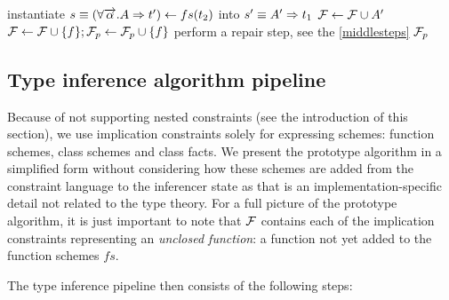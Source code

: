 \begin{algorithm}
\begin{algorithmic}
                    \State instantiate $s \equiv (\forall \overrightarrow{\alpha} . A \Rightarrow t') \gets fs(t_2)$ into $s' \equiv A' \Rightarrow t_1$
                    \State $\mathcal F \gets \mathcal F \cup A'$
                \Else
                    \State $ \mathcal F \gets \mathcal F \cup \{f\}; \mathcal F_p \gets \mathcal F_p \cup \{f\}$ 
                \EndIf
            \EndIf
            \State perform a repair step, see the \cref{middlesteps}
        \EndWhile
        \State \Return $\mathcal F_p$
    \end{algorithmic}
\end{algorithm}

\subsection{Type inference algorithm pipeline}

Because of not supporting nested constraints (see the introduction of this section), we use implication constraints solely for expressing schemes: function schemes, class schemes and class facts. We present the prototype algorithm in a simplified form without considering how these schemes are added from the constraint language to the inferencer state as that is an implementation-specific detail not related to the type theory. For a full picture of the prototype algorithm, it is just important to note that $\mathcal F$ contains each of the implication constraints representing an \emph{unclosed function}: a function not yet added to the function schemes $fs$.

The type inference pipeline then consists of the following steps:

